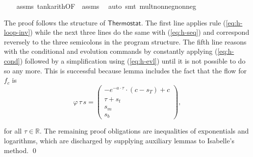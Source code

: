 \documentclass[envcountsame]{llncs}
\newcommand{\flow}{\varphi}
\newcommand{\reals}{\mathbb{R}}
\begin{document}
\begin{example}
\begin{isabellebody}
\ \ \isamarkupfalse%
\ assms\ tank{\isacharunderscore}arith{\isacharbrackleft}OF\ {\isacharunderscore}\ assms{\isacharparenleft}{}{\isacharcomma}{}{\isacharparenright}{\isacharbrackright}\ \isamarkupfalse%
\ auto\ {\isacharparenleft}smt\ mult{\isacharunderscore}nonneg{\isacharunderscore}nonneg{\isacharparenright}{\isacharplus}\isanewline
\isanewline
\end{isabellebody}

The proof follows the structure of $\mathsf{Thermostat}$. The first line applies rule (\ref{eq:h-loop-inv}) while the next three lines do the same with (\ref{eq:h-seq}) and correspond reversely to the three semicolons in the program structure. The fifth line reasons with the conditional and evolution commands by constantly applying (\ref{eq:h-cond}) followed by a simplification using (\ref{eq:h-evl}) until it is not possible to do so any more. This is successful because lemma  includes the fact that the flow for $f_c$ is  
\begin{equation*}
\flow\, \tau\, s = 
	\begin{pmatrix}
      -e^{-a\cdot\tau}\cdot(c-s_T)+c\\
      \tau+s_t\\
	s_m\\
	s_b
    \end{pmatrix},
\end{equation*}


for all $\tau\in\reals$. The remaining proof obligations are inequalities of exponentials and logarithms, which are discharged by supplying auxiliary lemmas to Isabelle's  method. \qed
\end{example}
\end{document}
